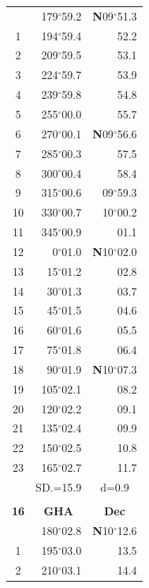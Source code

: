 \documentclass[10pt, a4paper]{report}
\begin{document}
\begin{scriptsize}
\begin{tabular*}{0.2\textwidth}[t]{@{\extracolsep{\fill}}|c|rr|}
\hline\rule{0pt}{2.6ex}\noindent
0 & 179$^\circ$59.2 & \textbf{N}09$^\circ$51.3\\
1 & 194$^\circ$59.4 & 52.2\\
2 & 209$^\circ$59.5 & 53.1\\
3 & 224$^\circ$59.7 & \raisebox{0.24ex}{\boldmath$\cdot$~\boldmath$\cdot$~~}53.9\\
4 & 239$^\circ$59.8 & 54.8\\
5 & 255$^\circ$00.0 & 55.7\\[2Pt]
6 & 270$^\circ$00.1 & \textbf{N}09$^\circ$56.6\\
7 & 285$^\circ$00.3 & 57.5\\
8 & 300$^\circ$00.4 & 58.4\\
9 & 315$^\circ$00.6 & 09$^\circ$59.3\\
10 & 330$^\circ$00.7 & 10$^\circ$00.2\\
11 & 345$^\circ$00.9 & 01.1\\[2Pt]
12 & 0$^\circ$01.0 & \textbf{N}10$^\circ$02.0\\
13 & 15$^\circ$01.2 & 02.8\\
14 & 30$^\circ$01.3 & 03.7\\
15 & 45$^\circ$01.5 & \raisebox{0.24ex}{\boldmath$\cdot$~\boldmath$\cdot$~~}04.6\\
16 & 60$^\circ$01.6 & 05.5\\
17 & 75$^\circ$01.8 & 06.4\\[2Pt]
18 & 90$^\circ$01.9 & \textbf{N}10$^\circ$07.3\\
19 & 105$^\circ$02.1 & 08.2\\
20 & 120$^\circ$02.2 & 09.1\\
21 & 135$^\circ$02.4 & \raisebox{0.24ex}{\boldmath$\cdot$~\boldmath$\cdot$~~}09.9\\
22 & 150$^\circ$02.5 & 10.8\\
23 & 165$^\circ$02.7 & 11.7\\
\hline
\rule{0pt}{2.4ex} & \multicolumn{1}{c}{SD.=15.9} & \multicolumn{1}{c|}{d=0.9}\\
\hline
\multicolumn{1}{c}{}\\[-0.5ex]\hline
\multicolumn{1}{|c|}{\rule{0pt}{2.6ex}\textbf{16}} & \multicolumn{1}{c}{\textbf{GHA}} & \multicolumn{1}{c|}{\textbf{Dec}}\\
\hline\rule{0pt}{2.6ex}\noindent
0 & 180$^\circ$02.8 & \textbf{N}10$^\circ$12.6\\
1 & 195$^\circ$03.0 & 13.5\\
2 & 210$^\circ$03.1 & 14.4\\

\end{tabular*}
\end{scriptsize}
\end{document}

